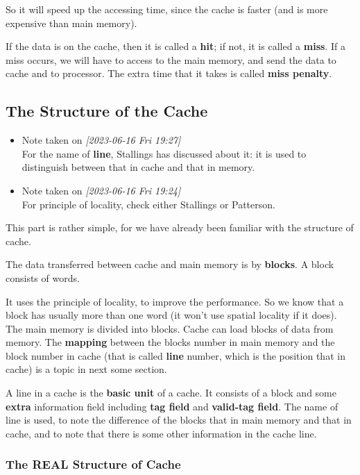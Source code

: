 \documentclass[11pt]{article}
\begin{document}
So it will speed up the accessing time, since the cache is faster (and is more expensive than main memory).

If the data is on the cache, then it is called a \textbf{hit}; if not, it is called a \textbf{miss}. If a miss occurs, we will have to access to the main memory, and send the data to cache and to processor. The extra time that it takes is called \textbf{miss penalty}.

\subsection{The Structure of the Cache}
\label{sec:org0283ed7}

\begin{itemize}
\item Note taken on \textit{[2023-06-16 Fri 19:27] } \\
For the name of \textbf{line}, Stallings has discussed about it: it is used to distinguish between that in cache and that in memory.
\item Note taken on \textit{[2023-06-16 Fri 19:24] } \\
For principle of locality, check either Stallings or Patterson.
\end{itemize}

This part is rather simple, for we have already been familiar with the structure of cache. 

The data transferred between cache and main memory is by \textbf{blocks}. A block consists of words.

It uses the principle of locality, to improve the performance. So we know that a block has usually more than one word (it won't use spatial locality if it does). The main memory is divided into blocks. Cache can load blocks of data from memory. The \textbf{mapping} between the blocks number in main memory and the block number in cache (that is called \textbf{line} number, which is the position that in cache) is a topic in next some section.

A line in a cache is the \textbf{basic unit} of a cache. It consists of a block and some \textbf{extra} information field including \textbf{tag field} and \textbf{valid-tag field}. The name of line is used, to note the difference of the blocks that in main memory and that in cache, and to note that there is some other information in the cache line.

\subsubsection{The REAL Structure of Cache}
\label{sec:orga940e93}
\end{document}
